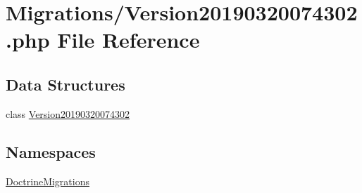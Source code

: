 \hypertarget{_version20190320074302_8php}{}\section{Migrations/\+Version20190320074302.php File Reference}
\label{_version20190320074302_8php}
\subsection*{Data Structures}
\begin{DoxyCompactItemize}
\item 
class \mbox{\hyperlink{class_doctrine_migrations_1_1_version20190320074302}{Version20190320074302}}
\end{DoxyCompactItemize}
\subsection*{Namespaces}
\begin{DoxyCompactItemize}
\item 
 \mbox{\hyperlink{namespace_doctrine_migrations}{Doctrine\+Migrations}}
\end{DoxyCompactItemize}
